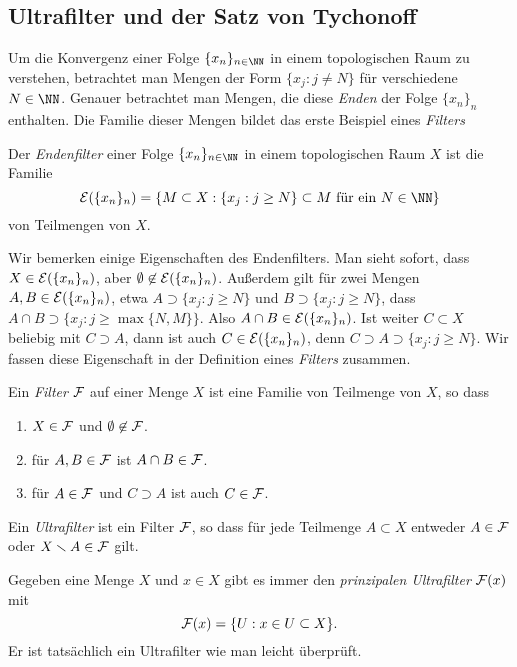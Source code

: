 \subsection{Ultrafilter und der Satz von Tychonoff}

Um die Konvergenz einer Folge $\{x_n\}_{n\in\NN}$ in einem topologischen Raum zu verstehen, betrachtet man Mengen der Form $\{x_j : j\neq N\}$ für verschiedene $N\in\NN$. Genauer betrachtet man Mengen, die diese \emph{Enden} der Folge $\{x_n\}_n$ enthalten. Die Familie dieser Mengen bildet das erste Beispiel eines \emph{Filters}

\begin{definition}
  Der \emph{Endenfilter} einer Folge $\{x_n\}_{n\in\NN}$ in einem topologischen Raum $X$ ist die Familie
  \[
    \cal E(\{x_n\}_n) = \{M\subset X : \text{$\{x_j : j\geq N\}\subset M$ für ein $N\in\NN$}\}
  \]
  von Teilmengen von $X$.
\end{definition}

Wir bemerken einige Eigenschaften des Endenfilters. Man sieht sofort, dass $X\in\cal E(\{x_n\}_n)$, aber $\emptyset\not\in \cal E(\{x_n\}_n)$. Außerdem gilt für zwei Mengen $A,B\in\cal E(\{x_n\}_n)$, etwa $A\supset \{x_j : j\geq N\}$ und $B\supset\{x_j : j\geq N\}$, dass $A\cap B\supset \{x_j : j\geq\max\{N,M\}\}$. Also $A\cap B\in \cal E(\{x_n\}_n)$. Ist weiter $C\subset X$ beliebig mit $C\supset A$, dann ist auch $C\in \cal E(\{x_n\}_n)$, denn $C\supset A\supset \{x_j : j \geq N\}$. Wir fassen diese Eigenschaft in der Definition eines \emph{Filters} zusammen.
\begin{definition}
  Ein \emph{Filter} $\cal F$ auf einer Menge $X$ ist eine Familie von Teilmenge von $X$, so dass
  \begin{enumerate}
    \item $X\in \cal F$ und $\emptyset\not\in\cal F$.
    \item für $A,B\in\cal F$ ist $A\cap B\in\cal F$.
    \item für $A\in\cal F$ und $C\supset A$ ist auch $C\in\cal F$.
  \end{enumerate}
  Ein \emph{Ultrafilter} ist ein Filter $\cal F$, so dass für jede Teilmenge $A\subset X$ entweder $A\in\cal F$ oder $X\setminus A\in\cal F$ gilt.
\end{definition}

Gegeben eine Menge $X$ und $x\in X$ gibt es immer den \emph{prinzipalen Ultrafilter} $\cal F(x)$ mit
\[
  \cal F(x) = \{U : x\in U\subset X\}.
\]
Er ist tatsächlich ein Ultrafilter wie man leicht überprüft.

